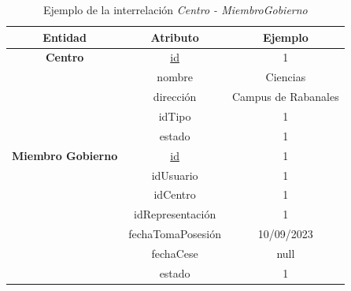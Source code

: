 \begin{itemize}
    \begin{table}[H]
    \centering
        \begin{tabular}{ | c | c | c |  }
             \hline
                 \textbf{Entidad} & \textbf{Atributo} & \textbf{Ejemplo}\\       
             \hline
                 \textbf{Centro}  & \underline{id} & 1\\
                  & nombre & Ciencias\\
                  & dirección & Campus de Rabanales\\
                  & idTipo & 1\\
                  & estado & 1\\
             \hline
                 \textbf{Miembro Gobierno}  & \underline{id} & 1\\
                  & idUsuario & 1\\
                  & idCentro & 1\\
                  & idRepresentación & 1\\
                  & fechaTomaPosesión & 10/09/2023\\
                  & fechaCese & null\\
                  & estado & 1\\
        \end{tabular}
        \caption{Ejemplo de la interrelación \textit{Centro - MiembroGobierno}}
        \label{table:I-Ct-MiGob}
    \end{table}
\end{itemize}

